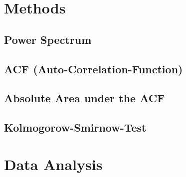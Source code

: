 \documentclass[12 pt]{scrartcl}
\begin{document}







\section{Methods}


\subsection{Power Spectrum}


\subsection{ACF (Auto-Correlation-Function)}



\subsection{Absolute Area under the ACF}

\subsection{Kolmogorow-Smirnow-Test}

\section{Data Analysis}
\end{document}
